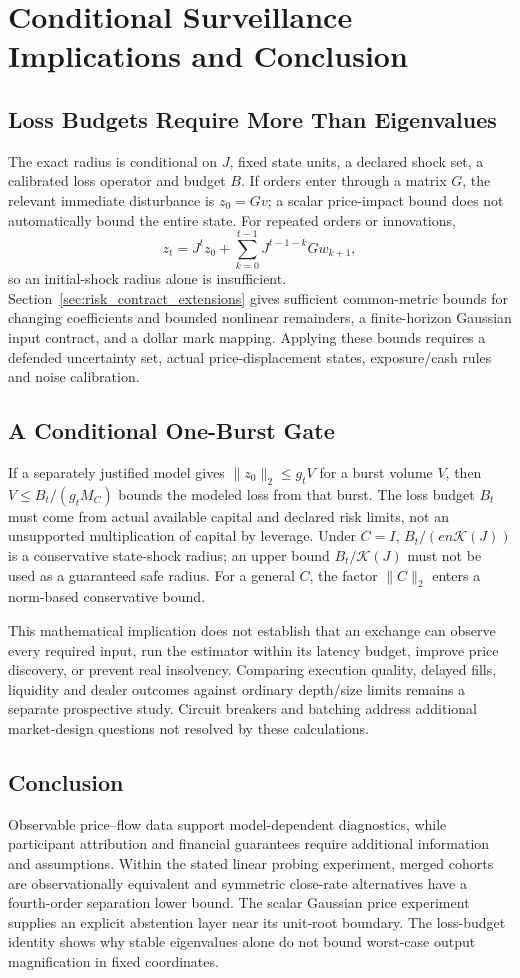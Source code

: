 \documentclass[12pt]{article}
\theoremstyle{definition}
\theoremstyle{remark}
\begin{document}
\section{Conditional Surveillance Implications and Conclusion}
\label{sec:policy_conclusion}
\subsection{Loss Budgets Require More Than Eigenvalues}
The exact radius is conditional on $J$, fixed state units, a declared shock set, a calibrated loss operator and budget $B$. If orders enter through a matrix $G$, the relevant immediate disturbance is $z_0=Gv$; a scalar price-impact bound does not automatically bound the entire state. For repeated orders or innovations,
\[
z_t=J^tz_0+\sum_{k=0}^{t-1}J^{t-1-k}Gw_{k+1},
\]
so an initial-shock radius alone is insufficient. Section~\ref{sec:risk_contract_extensions} gives sufficient common-metric bounds for changing coefficients and bounded nonlinear remainders, a finite-horizon Gaussian input contract, and a dollar mark mapping. Applying these bounds requires a defended uncertainty set, actual price-displacement states, exposure/cash rules and noise calibration.

\subsection{A Conditional One-Burst Gate}
If a separately justified model gives $\|z_0\|_2\le g_t V$ for a burst volume $V$, then $V\le B_t/(g_t M_C)$ bounds the modeled loss from that burst. The loss budget $B_t$ must come from actual available capital and declared risk limits, not an unsupported multiplication of capital by leverage. Under $C=I$, $B_t/(e n\mathcal K(J))$ is a conservative state-shock radius; an upper bound $B_t/\mathcal K(J)$ must not be used as a guaranteed safe radius. For a general $C$, the factor $\|C\|_2$ enters a norm-based conservative bound.

This mathematical implication does not establish that an exchange can observe every required input, run the estimator within its latency budget, improve price discovery, or prevent real insolvency. Comparing execution quality, delayed fills, liquidity and dealer outcomes against ordinary depth/size limits remains a separate prospective study. Circuit breakers and batching address additional market-design questions not resolved by these calculations.

\subsection{Conclusion}
Observable price--flow data support model-dependent diagnostics, while participant attribution and financial guarantees require additional information and assumptions. Within the stated linear probing experiment, merged cohorts are observationally equivalent and symmetric close-rate alternatives have a fourth-order separation lower bound. The scalar Gaussian price experiment supplies an explicit abstention layer near its unit-root boundary. The loss-budget identity shows why stable eigenvalues alone do not bound worst-case output magnification in fixed coordinates.
\end{document}
